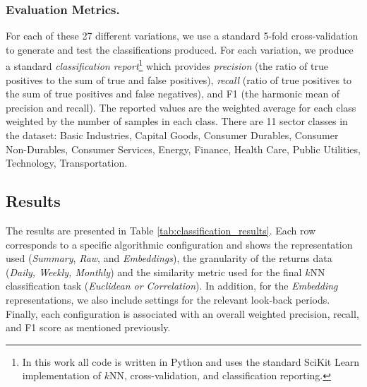 \documentclass[runningheads]{llncs}
\begin{document}
\subsubsection{Evaluation Metrics.} For each of these 27 different variations, we use a standard 5-fold cross-validation to generate and test the classifications produced. For each variation, we produce a standard \emph{classification report}\footnote{In this work all code is written in Python and uses the standard SciKit Learn implementation of $k$NN, cross-validation, and classification reporting.} which provides \emph{precision} (the ratio of true positives to the sum of true and false positives), \emph{recall} (ratio of true positives to the sum of true positives and false negatives), and F1 (the harmonic mean of precision and recall). The reported values are the weighted average for each class weighted by the number of samples in each class. There are 11 sector classes in the dataset: Basic Industries, Capital Goods, Consumer Durables, Consumer Non-Durables, Consumer Services, Energy, Finance, Health Care, Public Utilities, Technology, Transportation.





\subsection{Results}
The results are presented in Table \ref{tab:classification_results}. Each row corresponds to a specific algorithmic configuration and shows the representation used (\emph{Summary}, \emph{Raw}, and \emph{Embeddings}), the granularity of the returns data (\emph{Daily, Weekly, Monthly}) and the similarity metric used for the final $k$NN classification task (\emph{Euclidean or Correlation}). In addition, for the \emph{Embedding} representations, we also include settings for the relevant look-back periods. Finally, each configuration is associated with an overall weighted precision, recall, and F1 score as mentioned previously.
\end{document}
